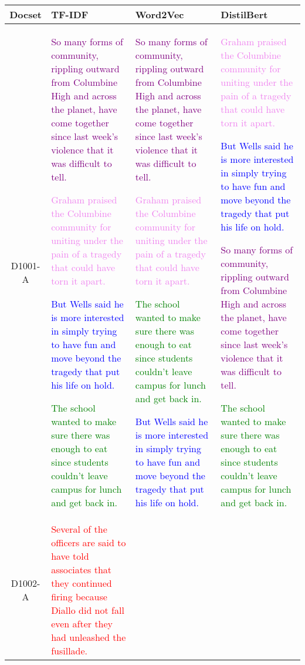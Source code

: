 \begin{table*}[h]
    \centering
    \begin{tabular}{|c|p{4.3cm}|p{4.3cm}|p{4.3cm}|}
        \hline
        Docset & TF-IDF & Word2Vec & DistilBert \\
        \hline
        D1001-A & 
        \textcolor{purple}{So many forms of community, rippling outward from Columbine High and across the planet, have come together since last week's violence that it was difficult to tell.}
        
        \textcolor{violet}{Graham praised the Columbine community for uniting under the pain of a tragedy that could have torn it apart.}
        
        \textcolor{blue}{But Wells said he is more interested in simply trying to have fun and move beyond the tragedy that put his life on hold.}
        
        \textcolor{green}{The school wanted to make sure there was enough to eat since students couldn't leave campus for lunch and get back in.}
        & 
        \textcolor{purple}{So many forms of community, rippling outward from Columbine High and across the planet, have come together since last week's violence that it was difficult to tell.}
        
        \textcolor{violet}{Graham praised the Columbine community for uniting under the pain of a tragedy that could have torn it apart.}
        
        \textcolor{green}{The school wanted to make sure there was enough to eat since students couldn't leave campus for lunch and get back in.}
        
        \textcolor{blue}{But Wells said he is more interested in simply trying to have fun and move beyond the tragedy that put his life on hold.}
        & 
        \textcolor{violet}{Graham praised the Columbine community for uniting under the pain of a tragedy that could have torn it apart.}
        
        \textcolor{blue}{But Wells said he is more interested in simply trying to have fun and move beyond the tragedy that put his life on hold.}
        
        \textcolor{purple}{So many forms of community, rippling outward from Columbine High and across the planet, have come together since last week's violence that it was difficult to tell.}
        
        \textcolor{green}{The school wanted to make sure there was enough to eat since students couldn't leave campus for lunch and get back in.}
        \\
        \hline
        D1002-A 
        & 
        \textcolor{red}{Several of the officers are said to have told associates that they continued firing because Diallo did not fall even after they had unleashed the fusillade.}
        

\end{tabular}
\end{table*}
